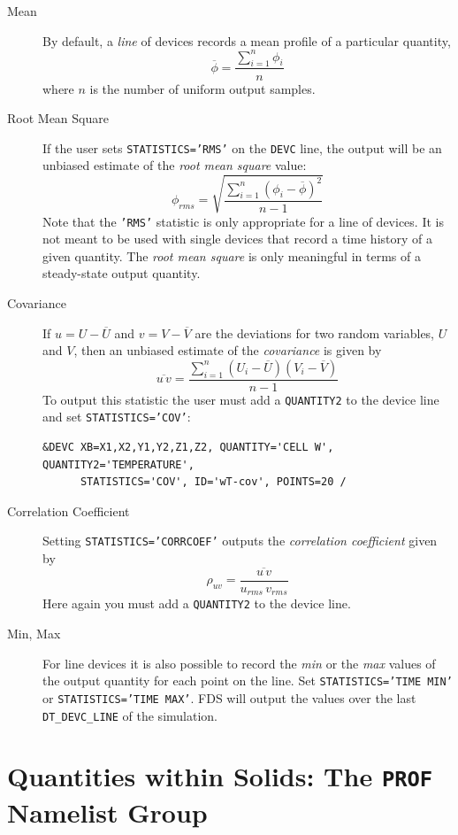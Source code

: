 \documentclass[11pt]{book}
\newcommand{\ct}{\tt\small}
\newcommand{\be}{\begin{equation}}
\newcommand{\ee}{\end{equation}}
\begin{document}
\begin{description}
\item[Mean] By default, a {\em line} of devices records a mean profile of a particular quantity,
\be
   \overline{\phi} = \frac{ \sum_{i=1}^n \phi_i }{n}
\ee
where $n$ is the number of uniform output samples.
\item[Root Mean Square] If the user sets {\ct STATISTICS='RMS'} on the {\ct DEVC} line, the output will be an unbiased estimate of the {\em root mean square} value:
\be
   \phi_{rms} = \sqrt{ \frac{ \sum_{i=1}^n (\phi_i - \overline{\phi})^2 }{n-1} }
\ee
Note that the {\ct 'RMS'} statistic is only appropriate for a line of devices. It is not meant to be used with single devices that record a time history of a given quantity. The {\em root mean square} is only meaningful in terms of a steady-state output quantity.
\item[Covariance] If $u = U - \overline{U}$ and $v= V-\overline{V}$ are the deviations for two random variables, $U$ and $V$, then an unbiased estimate of the \emph{covariance} is given by
\be
   \overline{u\, v} = \frac{ \sum_{i=1}^n (U_i - \overline{U}) (V_i - \overline{V}) }{n-1}
\ee
To output this statistic the user must add a {\ct QUANTITY2} to the device line and set {\ct STATISTICS='COV'}:
\footnotesize
\begin{verbatim}
&DEVC XB=X1,X2,Y1,Y2,Z1,Z2, QUANTITY='CELL W', QUANTITY2='TEMPERATURE',
      STATISTICS='COV', ID='wT-cov', POINTS=20 /
\end{verbatim}
\normalsize
\item[Correlation Coefficient] Setting {\ct STATISTICS='CORRCOEF'} outputs the \emph{correlation coefficient} given by
\be
   \rho_{uv} = \frac{ \overline{u\, v} }{ u_{rms} \,v_{rms} }
\ee
Here again you must add a {\ct QUANTITY2} to the device line.
\item[Min, Max] For line devices it is also possible to record the \emph{min} or the \emph{max} values of the output quantity for each point on the line.  Set {\ct STATISTICS='TIME MIN'} or {\ct STATISTICS='TIME MAX'}.  FDS will output the values over the last {\ct DT\_DEVC\_LINE} of the simulation.
\end{description}




\clearpage

\section{Quantities within Solids: The \texorpdfstring{{\tt PROF}}{PROF} Namelist Group}
\label{info:PROF}
\end{document}
